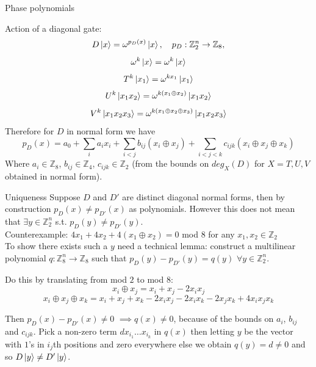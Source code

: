 \documentclass{beamer}
\theoremstyle{definition}
\begin{document}
\begin{frame}{Phase polynomials}

Action of a diagonal gate:
$$ D \ket{x} = \omega^{p_D(x)}\ket{x}, \quad p_D: \mathbb{Z}_2^n \rightarrow \mathbb{Z}_8 ,$$
$$ \omega^k \ket{x} = \omega^k \ket{x} $$
$$ T^k \ket{x_1} = \omega^{kx_1}\ket{x_1}$$
$$ U^k \ket{x_1x_2} = \omega^{k(x_1\oplus x_2)}\ket{x_1x_2}$$
$$ V^k \ket{x_1x_2x_3} = \omega^{k(x_1\oplus x_2 \oplus x_3)}\ket{x_1x_2x_3}$$
Therefore for $D$ in normal form we have
$$ p_D(x) = a_0 + \sum_i a_i x_i + \sum_{i<j}b_{ij} (x_i \oplus x_j) + \sum_{i<j<k}c_{ijk} (x_i \oplus x_j \oplus x_k)$$
Where $a_i \in \mathbb{Z}_8$, $b_{ij} \in \mathbb{Z}_4$, $c_{ijk} \in \mathbb{Z}_2$ (from the bounds on $deg_X(D)$ for $X=T,U,V$ obtained in normal form).

\end{frame}

\begin{frame}{Uniqueness}
Suppose $D$ and $D'$ are distinct diagonal normal forms, then by construction $p_D(x) \neq p_{D'}(x)$ as polynomials. However this does not mean that $\exists y \in \mathbb{Z}_2^n$ s.t. $p_D(y) \neq p_{D'}(y)$.\\

Counterexample: $4x_1 + 4x_2 + 4(x_1 \oplus x_2) = 0$ mod $8$ for any $x_1, x_2 \in \mathbb{Z}_2$\\

To show there exists such a $y$ need a technical lemma: construct a multilinear polynomial $q : \mathbb{Z}_8^n \rightarrow \mathbb{Z}_8$ such that $p_D(y)- p_{D'}(y) = q(y)$ $\forall y \in \mathbb{Z}_2^n$.

Do this by translating from mod $2$ to mod $8$:
$$ x_i \oplus x_j = x_i + x_j -2x_ix_j $$
$$ x_i \oplus x_j \oplus x_k = x_i + x_j + x_k -2x_ix_j -2x_ix_k -2x_jx_k + 4x_ix_jx_k$$

Then $p_D(x) - p_{D'}(x) \neq 0$ $\implies q(x) \neq 0$, because of the bounds on $a_i$, $b_{ij}$ and $c_{ijk}$. Pick a non-zero term $d x_{i_1} \dots x_{i_k}$ in $q(x)$ then letting $y$ be the vector with $1$'s in $i_j$th positions and zero everywhere else we obtain $q(y) = d \neq 0$ and so $D\ket{y} \neq D' \ket{y}$.
\end{frame}
\end{document}
